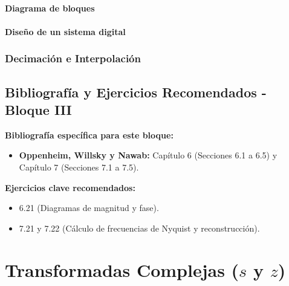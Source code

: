 \documentclass[11pt,a4paper,openany]{book}
\begin{document}
\subsection{Diagrama de bloques}

\subsection{Diseño de un sistema digital}

\section{Decimación e Interpolación}



\cleardoublepage
{}
{}
\chapter*{Bibliografía y Ejercicios Recomendados - Bloque III}

\textbf{Bibliografía específica para este bloque:}
\begin{itemize}
	\item \textbf{Oppenheim, Willsky y Nawab:} Capítulo 6 (Secciones 6.1 a 6.5) y Capítulo 7 (Secciones 7.1 a 7.5).
\end{itemize}

\textbf{Ejercicios clave recomendados:}
\begin{itemize}
	\item 6.21 (Diagramas de magnitud y fase).
	\item 7.21 y 7.22 (Cálculo de frecuencias de Nyquist y reconstrucción).
\end{itemize}


\part{Transformadas Complejas ($s$ y $z$)}
\end{document}
